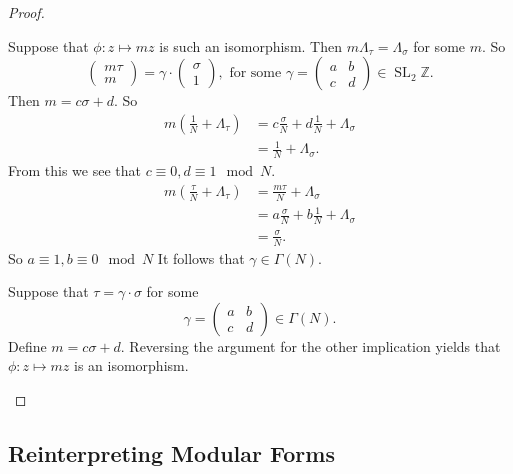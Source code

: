 \documentclass[titlepage,a4paper]{article}
\theoremstyle{theoremdd}
\theoremstyle{definitiondd}
\theoremstyle{remarkdd}
\newcommand{\Z}{\mathbb{Z}}
\newcommand{\ltr}{\par \noindent \framebox[1\width]{ $\implies$ } \hspace{.2cm}}
\newcommand{\rtl}{\par \noindent \framebox[1\width]{ $\impliedby$ } \hspace{.2cm} }
\DeclareMathOperator{\SL}{SL}
\begin{document}
\begin{proof}
\begin{enumerate}
	\ltr Suppose that $\phi: z\mapsto  m z$ is such an isomorphism.
	Then $m \Lambda_\tau = \Lambda_\sigma$ for some $m$. So \[
	\begin{pmatrix} m \tau \\ m \end{pmatrix} = 
	\gamma \cdot  \begin{pmatrix} \sigma \\ 1 \end{pmatrix} , 
	\text{ for some } \gamma = \begin{pmatrix} a & b \\ c & d \end{pmatrix} \in \SL_2 \Z
	.\] 
	Then $m = c \sigma + d$. So 
	 \begin{align*}
		 m \left( \frac{1}{N} + \Lambda_\tau \right)  &= c \frac{\sigma}{N} + d \frac{1}{N} + \Lambda_\sigma \\
		 &=  \frac{1}{N} + \Lambda_\sigma
	.\end{align*}
	From this we see that $c \equiv 0, d \equiv 1 \mod N$. 
	\begin{align*}
		m\left(\frac{\tau}{N} + \Lambda_\tau\right) &= \frac{m\tau}{N} + \Lambda_\sigma \\
		&= a \frac{\sigma}{N} + b \frac{1}{N} + \Lambda_\sigma \\
		&= \frac{\sigma}{N} 
	.\end{align*}
	So $a \equiv 1, b \equiv 0 \mod N$
	It follows that $\gamma  \in \Gamma(N)$. 

	\rtl Suppose that $\tau = \gamma \cdot \sigma$ for some \[
		\gamma = \begin{pmatrix} a & b \\ c & d  \end{pmatrix} \in \Gamma(N)
	.\] 	
	Define $m = c \sigma + d$. Reversing the argument for the other implication yields that $\phi:z \mapsto m z$ is an isomorphism.
	\end{enumerate}
\end{proof}

\subsection{Reinterpreting Modular Forms} \label{sec:reintepreting_modular_forms}
\end{document}
